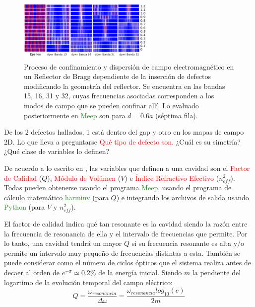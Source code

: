 \documentclass{book}
\begin{document}
\begin{figure}[ht]
 \centering
   \includegraphics[width=0.6\textwidth]{Cavidades.png}
   \caption{Proceso de confinamiento y dispersión de campo electromagnético en un Reflector de Bragg dependiente de la inserción de defectos modificando la geometría del reflector. Se encuentra en las bandas 15, 16, 31 y 32, cuyas frecuencias asociadas corresponden a los modos de campo que se pueden confinar allí. Lo evaluado posteriormente en \textcolor{ForestGreen}{Meep} son para $d=0.6a$ (séptima fila).}
\end{figure}


De los 2 defectos hallados, 1 está dentro del gap y otro en los mapas de campo 2D. Lo que lleva a preguntarse \textcolor{red}{Qué tipo de defecto son}. ¿Cuál es su simetría? ¿Qué clase de variables lo definen?

De acuerdo a lo escrito en \textcolor{red}{\cite{Tío}}, las variables que definen a una cavidad son el \textcolor{red}{Factor de Calidad} ($Q$), \textcolor{red}{Módulo de Volúmen} ($V$) e \textcolor{red}{Índice Refractivo Efectivo} ($n_{eff}^2$). Todas pueden obtenerse usando el programa \textcolor{ForestGreen}{Meep}, usando el programa de cálculo matemático \textcolor{ForestGreen}{harminv} (para $Q$) e integrando los archivos de salida usando \textcolor{ForestGreen}{Python} (para $V$ y $n_{eff}^2$).

El factor de calidad indica qué tan resonante es la cavidad siendo la razón entre la frecuencia de resonancia de ella y el intervalo de frecuencias que permite. Por lo tanto, una cavidad tendrá un mayor $Q$ si su frecuencia resonante es alta y/o permite un intervalo muy pequeño de frecuencias distintas a esta. También se puede considerar como el número de ciclos ópticos que el sistema realiza antes de decaer al orden de $e^{-\pi} \simeq 0.2\%$ de la energía inicial. Siendo $m$ la pendiente del logartimo de la evolución temporal del campo eléctrico:
\begin{equation}\label{eq5.1}Q=\frac{\omega_{resonancia}}{\Delta\omega}=\frac{\omega_{resonancia}log_{10}(e)}{2m}\end{equation}
\end{document}
